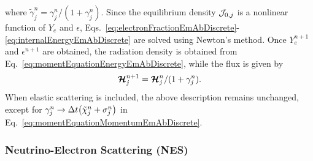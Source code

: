 \documentclass[10pt,preprint]{aastex}
\begin{document}
where $\tilde{\gamma}_{j}^{n}=\gamma_{j}^{n}/(1+\gamma_{j}^{n})$.  
Since the equilibrium density $\mathcal{J}_{0,j}$ is a nonlinear function of $Y_{e}$ and $\epsilon$, Eqs.~\eqref{eq:electronFractionEmAbDiscrete}-\eqref{eq:internalEnergyEmAbDiscrete} are solved using Newton's method.  
Once $Y_{e}^{n+1}$ and $\epsilon^{n+1}$ are obtained, the radiation density is obtained from Eq.~\eqref{eq:momentEquationEnergyEmAbDiscrete}, while the flux is given by
\begin{equation}
  \boldsymbol{\mathcal{H}}_{j}^{n+1}=\boldsymbol{\mathcal{H}}_{j}^{n}/(1+\gamma_{j}^{n}).  
  \label{eq:momentEquationMomentumEmAbDiscrete}
\end{equation}
When elastic scattering is included, the above description remains unchanged, except for $\gamma_{j}^{n}\to\Delta t\big(\tilde{\chi}_{j}^{n}+\sigma_{j}^{n}\big)$ in Eq.~\eqref{eq:momentEquationMomentumEmAbDiscrete}.  

\subsubsection{Neutrino-Electron Scattering (NES)}
\end{document}
